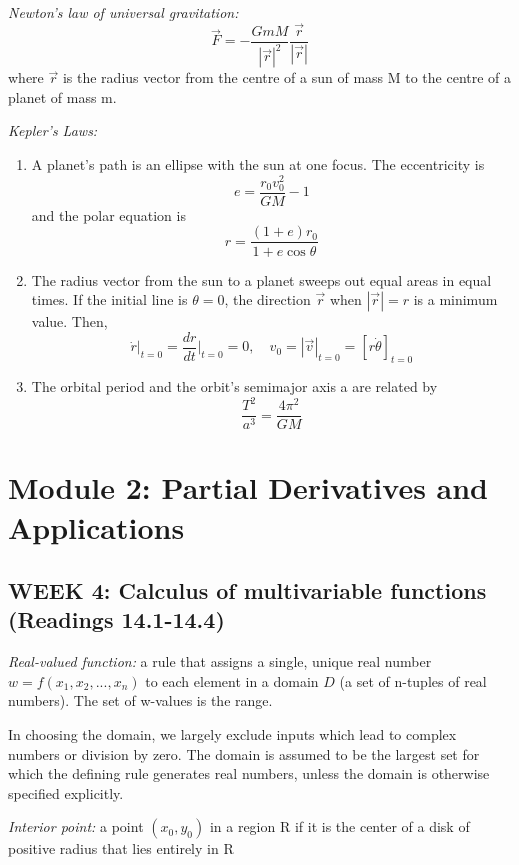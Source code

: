 \documentclass[12pt]{article}
\begin{document}
\emph{Newton's law of universal gravitation:}
\[\vec{F} = -\frac{GmM}{|\vec{r}|^2} \frac{\vec{r}}{|\vec{r}|}\]
where $\vec{r}$ is the radius vector from the centre of a sun of mass M to the centre of a planet of mass m.

\emph{Kepler's Laws:}
\begin{enumerate}
    \item A planet's path is an ellipse with the sun at one focus. The eccentricity is 
    \[e = \frac{r_0 v_0^2}{GM} - 1\]
    and the polar equation is 
    \[r = \frac{(1+e)r_0}{1 + e\cos \theta}\]
    \item The radius vector from the sun to a planet sweeps out equal areas in equal times. If the initial line is $\theta = 0$, the direction $\vec{r}$ when $|\vec{r}| = r$ is a minimum value. Then, 
    \[\dot{r}\big|_{t=0} = \frac{dr}{dt}\bigg|_{t=0} = 0, \quad v_0 = |\vec{v}|_{t=0} = [r \dot{\theta}]_{t=0}\]
    \item The orbital period and the orbit's semimajor axis a are related by 
    \[\frac{T^2}{a^3} = \frac{4\pi^2}{GM}\]
    
\end{enumerate}
\pagebreak
\section{Module 2: Partial Derivatives and Applications}
\subsection{WEEK 4: Calculus of multivariable functions (Readings 14.1-14.4)}
\emph{Real-valued function:} a rule that assigns a single, unique real number $w = f(x_1, x_2, ..., x_n)$ to each element in a domain $D$ (a set of n-tuples of real numbers). The set of w-values is the range. 

In choosing the domain, we largely exclude inputs which lead to complex numbers or division by zero. The domain is assumed to be the largest set for which the defining rule generates real numbers, unless the domain is otherwise specified explicitly.

\emph{Interior point:} a point $(x_0, y_0)$ in a region R if it is the center of a disk of positive radius that lies entirely in R
\end{document}
